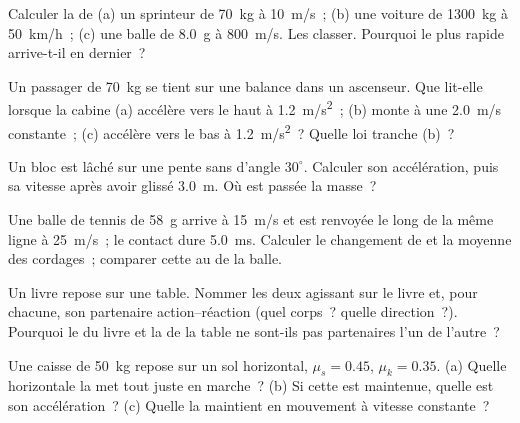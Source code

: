 \begin{exercise}[$\star$]\label{exo:g12:newtons-laws:1}
Calculer la  de (a) un sprinteur de
\qty{70}{kg} à \qty{10}{m/s}~; (b) une voiture de \qty{1300}{kg} à
\qty{50}{km/h}~; (c) une balle de \qty{8.0}{g} à \qty{800}{m/s}. Les
classer. Pourquoi le plus rapide arrive-t-il en dernier~?
\end{exercise}

\begin{exercise}[$\star$]\label{exo:g12:newtons-laws:2}
Un passager de \qty{70}{kg} se tient sur une balance dans un ascenseur.
Que lit-elle lorsque la cabine (a) accélère vers le haut à
\qty{1.2}{m/s^2}~; (b) monte à une \qty{2.0}{m/s} constante~; (c)
accélère vers le bas à \qty{1.2}{m/s^2}~? Quelle loi tranche (b)~?
\end{exercise}

\begin{exercise}[$\star$]\label{exo:g12:newtons-laws:3}
Un bloc est lâché sur une pente sans  d'angle $30^\circ$.
Calculer son accélération, puis sa vitesse après avoir glissé
\qty{3.0}{m}. Où est passée la masse~?
\end{exercise}

\begin{exercise}[$\star$]\label{exo:g12:newtons-laws:4}
Une balle de tennis de \qty{58}{g} arrive à \qty{15}{m/s} et est
renvoyée le long de la même ligne à \qty{25}{m/s}~; le contact dure
\qty{5.0}{ms}. Calculer le changement de
 et la 
moyenne des cordages~; comparer cette  au
 de la balle.
\end{exercise}

\begin{exercise}[$\star$]\label{exo:g12:newtons-laws:5}
Un livre repose sur une table. Nommer les deux 
agissant sur le livre et, pour chacune, son partenaire action--réaction
(quel corps~? quelle direction~?). Pourquoi le
 du livre et la  de la table ne sont-ils
pas partenaires l'un de l'autre~?
\end{exercise}

\begin{exercise}[$\star\star$]\label{exo:g12:newtons-laws:6}
Une caisse de \qty{50}{kg} repose sur un sol horizontal,
$\mu_s = 0.45$, $\mu_k = 0.35$.
(a) Quelle  horizontale la met tout juste en marche~?
(b) Si cette  est maintenue, quelle est son accélération~?
(c) Quelle  la maintient en mouvement à vitesse constante~?
\end{exercise}

